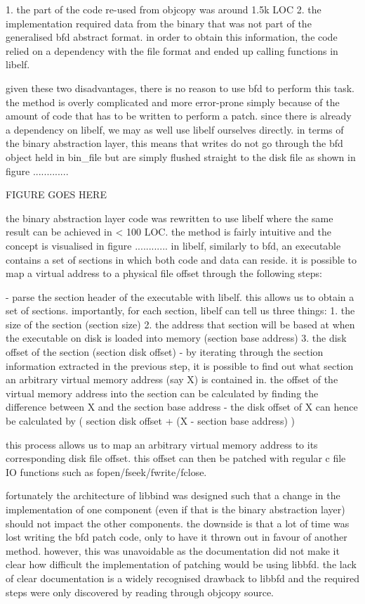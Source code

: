 1. the part of the code re-used from objcopy was around 1.5k LOC
2. the implementation required data from the binary that was not part of the generalised bfd abstract format. in order to obtain this information, the code relied on a dependency with the file format and ended up calling functions in libelf.

given these two disadvantages, there is no reason to use bfd to perform this task. the method is overly complicated and more error-prone simply because of the amount of code that has to be written to perform a patch. since there is already a dependency on libelf, we may as well use libelf ourselves directly. in terms of the binary abstraction layer, this means that writes do not go through the bfd object held in bin\_file but are simply flushed straight to the disk file as shown in figure .............

FIGURE GOES HERE
 
the binary abstraction layer code was rewritten to use libelf where the same result can be achieved in < 100 LOC. the method is fairly intuitive and the concept is visualised in figure ............ in libelf, similarly to bfd, an executable contains a set of sections in which both code and data can reside. it is possible to map a virtual address to a physical file offset through the following steps:

- parse the section header of the executable with libelf. this allows us to obtain a set of sections. importantly, for each section, libelf can tell us three things:
1. the size of the section (section size)
2. the address that section will be based at when the executable on disk is loaded into memory (section base address)
3. the disk offset of the section (section disk offset)
- by iterating through the section information extracted in the previous step, it is possible to find out what section an arbitrary virtual memory address (say X) is contained in. the offset of the virtual memory address into the section can be calculated by finding the difference between X and the section base address
- the disk offset of X can hence be calculated by ( section disk offset + (X - section base address) )

this process allows us to map an arbitrary virtual memory address to its corresponding disk file offset. this offset can then be patched with regular c file IO functions such as fopen/fseek/fwrite/fclose.

fortunately the architecture of libbind was designed such that a change in the implementation of one component (even if that is the binary abstraction layer) should not impact the other components. the downside is that a lot of time was lost writing the bfd patch code, only to have it thrown out in favour of another method. however, this was unavoidable as the documentation did not make it clear how difficult the implementation of patching would be using libbfd. the lack of clear documentation is a widely recognised drawback to libbfd and the required steps were only discovered by reading through objcopy source.

